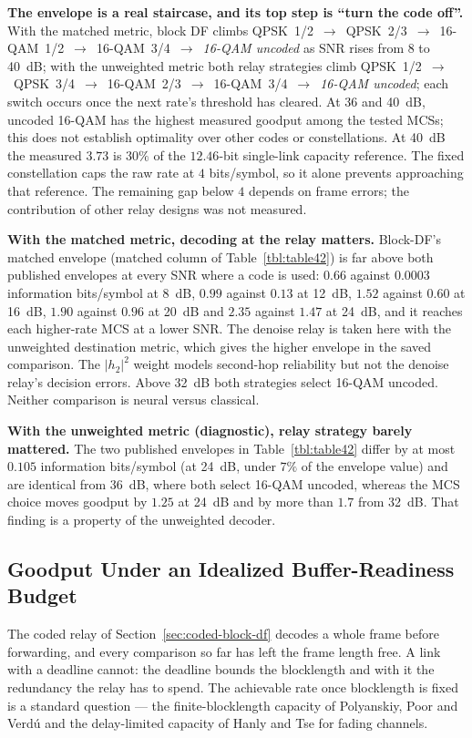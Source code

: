 \textbf{The envelope is a real staircase, and its top step is ``turn the code off''.} With the matched metric, block DF climbs QPSK~1/2~$\to$~QPSK~2/3~$\to$~16-QAM~1/2~$\to$~16-QAM~3/4~$\to$~\emph{16-QAM uncoded} as SNR rises from 8 to 40~dB; with the unweighted metric both relay strategies climb QPSK~1/2~$\to$~QPSK~3/4~$\to$~16-QAM~2/3~$\to$~16-QAM~3/4~$\to$~\emph{16-QAM uncoded}; each switch occurs once the next rate's threshold has cleared. At 36 and 40~dB, uncoded 16-QAM has the highest measured goodput among the tested MCSs; this does not establish optimality over other codes or constellations. At 40~dB the measured $3.73$ is $30\%$ of the $12.46$-bit single-link capacity reference. The fixed constellation caps the raw rate at $4$ bits/symbol, so it alone prevents approaching that reference. The remaining gap below $4$ depends on frame errors; the contribution of other relay designs was not measured.

\textbf{With the matched metric, decoding at the relay matters.} Block-DF's matched envelope (matched column of Table~\ref{tbl:table42}) is far above both published envelopes at every SNR where a code is used: $0.66$ against $0.0003$ information bits/symbol at 8~dB, $0.99$ against $0.13$ at 12~dB, $1.52$ against $0.60$ at 16~dB, $1.90$ against $0.96$ at 20~dB and $2.35$ against $1.47$ at 24~dB, and it reaches each higher-rate MCS at a lower SNR. The denoise relay is taken here with the unweighted destination metric, which gives the higher envelope in the saved comparison. The $|h_2|^{2}$ weight models second-hop reliability but not the denoise relay's decision errors. Above 32~dB both strategies select 16-QAM uncoded. Neither comparison is neural versus classical.

\textbf{With the unweighted metric (diagnostic), relay strategy barely mattered.} The two published envelopes in Table~\ref{tbl:table42} differ by at most $0.105$ information bits/symbol (at 24~dB, under $7\%$ of the envelope value) and are identical from 36~dB, where both select 16-QAM uncoded, whereas the MCS choice moves goodput by $1.25$ at 24~dB and by more than $1.7$ from 32~dB. That finding is a property of the unweighted decoder.

\subsection{Goodput Under an Idealized Buffer-Readiness Budget}\label{sec:coded-latency-capacity}

The coded relay of Section~\ref{sec:coded-block-df} decodes a whole frame before forwarding, and every comparison so far has left the frame length free. A link with a deadline cannot: the deadline bounds the blocklength and with it the redundancy the relay has to spend. The achievable rate once blocklength is fixed is a standard question --- the finite-blocklength capacity of Polyanskiy, Poor and Verd\'{u} \cite{PolyanskiyPoorVerdu2010FiniteBlocklength} and the delay-limited capacity of Hanly and Tse \cite{HanlyTse1998DelayLimited} for fading channels.

